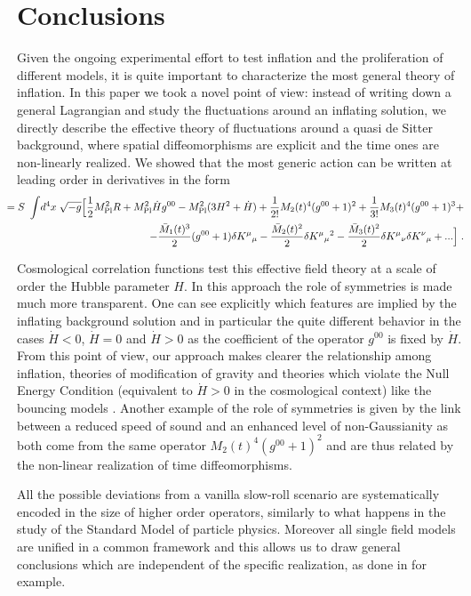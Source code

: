 \documentclass[12pt,letterpaper]{article}
\def\be{\begin{eqnarray}}
\def\ee{\end{eqnarray}}
\begin{document}
{\section{Conclusions}
Given the ongoing experimental effort to test inflation and the proliferation of
different models, it is quite important to characterize the most general
theory of inflation. In this paper we took a novel point of view:
instead of writing down a general Lagrangian and study the
fluctuations around an inflating solution, we directly describe the
effective theory of fluctuations around a quasi de Sitter background,
where spatial diffeomorphisms are explicit and the time ones are
non-linearly realized. We showed that the most generic action can be
written at leading order in derivatives in the form
\be
S & \!\!\!\!\!\!\!\!\!\!\!\!= \!\!\!\!\!\!\!\!\!& \!\!\!\int  \! d^4 x \; \sqrt{- g} \Big[ \frac12 M_{\rm Pl}^2 R + M_{\rm Pl}^2 \dot H
g^{00} - M_{\rm Pl}^2 (3 H^2 + \dot H) +
\frac{1}{2!}M_2(t)^4(g^{00}+1)^2+\frac{1}{3!}M_3(t)^4 (g^{00}+1)^3+
\nonumber \\
&& - \frac{\bar M_1(t)^3}{2} (g^{00}+1)\delta K^\mu {}_\mu
-\frac{\bar M_2(t)^2}{2} \delta K^\mu {}_\mu {}^2
-\frac{\bar M_3(t)^2}{2} \delta K^\mu {}_\nu \delta K^\nu {}_\mu + ...
\Big] \; .
\ee

Cosmological correlation functions test this
effective field theory at a scale of order the Hubble parameter
$H$. In this approach the role of symmetries is made much more
transparent. One can see explicitly which features are implied by the
inflating background solution and in particular the
quite different behavior in the cases $\dot H<0$,  $\dot H = 0$ and
$\dot H > 0$ as the coefficient of the operator $g^{00}$ is fixed by
$\dot H$. From this point of view, our approach makes clearer
the relationship among inflation, theories of modification
of gravity and theories which violate the Null Energy Condition
(equivalent to $\dot H >0$ in the cosmological context) like the
bouncing models \cite{Creminelli:2006xe,Buchbinder:2007ad,Creminelli:2007aq}. Another example of the role of symmetries is given by the link between a reduced
speed of sound and an enhanced level of non-Gaussianity as both come
from the same operator $M_2(t)^4(g^{00}+1)^2$ and are thus related by the non-linear
realization of time diffeomorphisms. 

All the possible deviations from a vanilla slow-roll 
scenario are systematically encoded in the size of higher order
operators, similarly to what happens in the study of the Standard
Model of particle physics. Moreover all single field models are
unified in a common framework and this allows us to draw general
conclusions which are independent of the specific realization, as
done in \cite{verification,ArkaniHamed:2007ky} for example.

}
\end{document}
